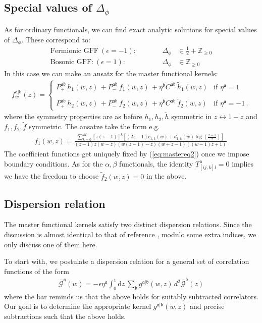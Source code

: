 \documentclass[12pt]{article}
\numberwithin{equation}{section}
\newcommand{\reef}[1]{(\ref{#1})}
\newcommand{\bea}{\begin{eqnarray}}
\newcommand{\eea}{\end{eqnarray}}
\newcommand{\ba}{\begin{equation}\begin{aligned}}
\newcommand{\ea}{\end{aligned}\end{equation}}
\newcommand{\ud}{\mathrm d}
\newcommand{\Df}{{\Delta_\phi}}
\newcommand{\mf}[1]{\mathfrak #1}
\begin{document}
	\subsection{Special values of $\Df$}
	As for ordinary functionals, we can find exact analytic solutions for special values of $\Df$. These correspond to:
	\ba
	\mbox{Fermionic GFF}\ (\epsilon=-1):&\qquad& \Df&\in \frac 12+\mathbb Z_{\geq 0}\\
	\mbox{Bosonic GFF:}\ (\epsilon=1):&\qquad& \Df&\in\mathbb Z_{\geq 0}
	\ea
	In this case we can make an ansatz for the master functional kernels:
	\bea
	f_w^{\mf a|\mf b}(z) = \begin{cases}P^{\mf a \mf b}_+ \, h_{1}(w,z) \, + P^{\mf a \mf b}_- \, f_{1}(w,z) \, + \eta^{\mf b} C^{\mf a \mf b} \, \tilde h_{1}(w,z) & \text{if } \eta^{\mf a}=1\\ \\
		P^{\mf a \mf b}_+ \, h_{2}(w,z) \, + P^{\mf a \mf b}_- \, f_{2}(w,z) \, + \eta^{\mf b} C^{\mf a \mf b} \, \tilde f_{2}(w,z) & \text{if } \eta^{\mf a}=-1\,. \end{cases}
	\eea
	where the symmetry properties are as before $h_1,h_2,\tilde h$ symmetric in $z\leftrightarrow 1-z$ and $f_1,f_2,\tilde f$ symmetric. The ansatze take the form e.g.
	\bea
	f_1(w,z)=\frac{\sum_{k=0}^M [z(z-1)]^k\left[(2z-1)c_{1,k}(w) +d_{1,k}(w) \log\left(\frac{z-1}z\right)\right]}{(z-1) z (w-z) (w (z-1)-z) (w+z-1) ((w-1) z+1)}\, 
	\eea
	The coefficient functions get uniquely fixed by \reef{eq:mastereq2} once we impose boundary conditions. As for the $\alpha,\beta$ functionals, the identity $T^{\mf a}_{[ij,k]l}=0$ implies we have the freedom to choose $\tilde f_2(w,z)=0$ in the above.
	
	
	\subsection{Dispersion relation}
	The master functional kernels satisfy two distinct dispersion relations. Since the discussion is almost identical to that of reference \cite{Paulos:2020zxx}, modulo some extra indices, we only discuss one of them here.
	
	To start with, we postulate a dispersion relation for a general set of correlation functions of the form
	\bea
	\overline{\mathcal G}^{\mf a}(w)=-\epsilon \eta^{\mf a}\int_0^1 \ud z\, \sum_{\mf b} g^{\mf a|\mf b}(w,z) \,d^2 \overline{\mathcal G}^{\mf b}(z)
	\eea
	where the bar reminds us that the above holds for suitably subtracted correlators. Our goal is to determine the appropriate kernel $g^{\mf a|\mf b}(w,z)$ and precise subtractions such that the above holds.
	
\end{document}
